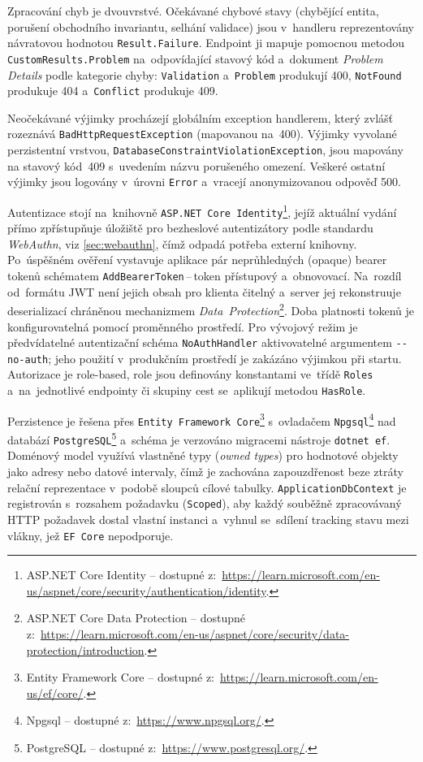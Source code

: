 Zpracování chyb je dvouvrstvé.
Očekávané chybové stavy (chybějící entita, porušení obchodního invariantu, selhání validace) jsou v~handleru reprezentovány návratovou hodnotou \texttt{Result.Failure}.
Endpoint ji mapuje pomocnou metodou \texttt{CustomResults.Problem} na~odpovídající stavový kód a~dokument \emph{Problem Details} podle kategorie chyby: \texttt{Validation} a~\texttt{Problem} produkují 400, \texttt{NotFound} produkuje 404 a~\texttt{Conflict} produkuje 409.

Neočekávané výjimky procházejí globálním exception handlerem, který zvlášť rozeznává \texttt{BadHttpRequestException} (mapovanou na~400).
Výjimky vyvolané perzistentní vrstvou, \texttt{DatabaseConstraintViolationException}, jsou mapovány na stavový kód~409 s~uvedením názvu porušeného omezení.
Veškeré ostatní výjimky jsou logovány v~úrovni \texttt{Error} a~vracejí anonymizovanou odpověď 500.

Autentizace stojí na~knihovně \texttt{ASP.NET~Core~Identity}\footnote{ASP.NET Core Identity -- dostupné z:~\url{https://learn.microsoft.com/en-us/aspnet/core/security/authentication/identity}.}, jejíž aktuální vydání přímo zpřístupňuje úložiště pro bezheslové autentizátory podle standardu \emph{WebAuthn}, viz \ref{sec:webauthn}, čímž odpadá potřeba externí knihovny.
Po~úspěšném ověření vystavuje aplikace pár neprůhledných (opaque) bearer tokenů schématem \texttt{AddBearerToken}\,--\,token přístupový a~obnovovací.
Na~rozdíl od~formátu JWT není jejich obsah pro klienta čitelný a~server jej rekonstruuje deserializací chráněnou mechanizmem \emph{Data~Protection}\footnote{ASP.NET Core Data Protection -- dostupné z:~\url{https://learn.microsoft.com/en-us/aspnet/core/security/data-protection/introduction}.}.
Doba platnosti tokenů je konfigurovatelná pomocí proměnného prostředí.
Pro vývojový režim je předvídatelné autentizační schéma \texttt{NoAuthHandler} aktivovatelné argumentem \texttt{-{}-no-auth}; jeho použití v~produkčním prostředí je zakázáno výjimkou při startu.
Autorizace je role-based, role jsou definovány konstantami ve~třídě \texttt{Roles} a~na~jednotlivé endpointy či skupiny cest se~aplikují metodou \texttt{HasRole}.

Perzistence je řešena přes \texttt{Entity~Framework~Core}\footnote{Entity Framework Core -- dostupné z:~\url{https://learn.microsoft.com/en-us/ef/core/}.} s~ovladačem \texttt{Npgsql}\footnote{Npgsql -- dostupné z:~\url{https://www.npgsql.org/}.} nad databází \texttt{PostgreSQL}\footnote{PostgreSQL -- dostupné z:~\url{https://www.postgresql.org/}.} a~schéma je verzováno migracemi nástroje \texttt{dotnet~ef}.
Doménový model využívá vlastněné typy (\emph{owned types}) pro hodnotové objekty jako adresy nebo datové intervaly, čímž je zachována zapouzdřenost beze ztráty relační reprezentace v~podobě sloupců cílové tabulky.
\texttt{ApplicationDbContext} je registrován s~rozsahem požadavku (\texttt{Scoped}), aby každý souběžně zpracovávaný HTTP požadavek dostal vlastní instanci a~vyhnul se~sdílení tracking stavu mezi vlákny, jež \texttt{EF~Core} nepodporuje.

